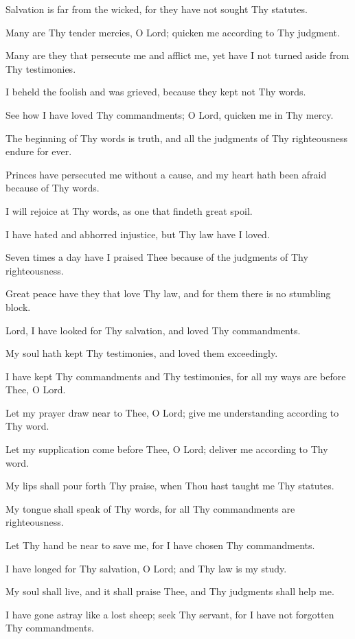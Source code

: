 Salvation is far from the wicked, for they have not sought Thy statutes.

Many are Thy tender mercies, O Lord; quicken me according to Thy judgment.

Many are they that persecute me and afflict me, yet have I not turned aside from Thy testimonies.

I beheld the foolish and was grieved, because they kept not Thy words.

See how I have loved Thy commandments; O Lord, quicken me in Thy mercy.

The beginning of Thy words is truth, and all the judgments of Thy righteousness endure for ever.

Princes have persecuted me without a cause, and my heart hath been afraid because of Thy words.

I will rejoice at Thy words, as one that findeth great spoil.

I have hated and abhorred injustice, but Thy law have I loved.

Seven times a day have I praised Thee because of the judgments of Thy righteousness.

Great peace have they that love Thy law, and for them there is no stumbling block.

Lord, I have looked for Thy salvation, and loved Thy commandments.

My soul hath kept Thy testimonies, and loved them exceedingly.

I have kept Thy commandments and Thy testimonies, for all my ways are before Thee, O Lord.

Let my prayer draw near to Thee, O Lord; give me understanding according to Thy word.

Let my supplication come before Thee, O Lord; deliver me according to Thy word.

My lips shall pour forth Thy praise, when Thou hast taught me Thy statutes.

My tongue shall speak of Thy words, for all Thy commandments are righteousness.

Let Thy hand be near to save me, for I have chosen Thy commandments.

I have longed for Thy salvation, O Lord; and Thy law is my study.

My soul shall live, and it shall praise Thee, and Thy judgments shall help me.

I have gone astray like a lost sheep; seek Thy servant, for I have not forgotten Thy commandments.

